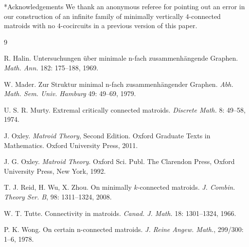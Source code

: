 \documentclass[12pt]{amsart}
\begin{document}
\begin{section}*{Acknowledgements}
We thank an anonymous referee for pointing out an error in our construction of an infinite family of minimally vertically $4$-connected matroids with no $4$-cocircuits in a previous version of this paper.
\end{section}



\begin{thebibliography}{9}

 R. Halin. Untersuchungen \"uber minimale n-fach zusammenh\"angende Graphen. \emph{Math. Ann.} 182: 175--188, 1969.

 W. Mader. Zur Struktur minimal n-fach zusammenh\"angender Graphen. \emph{Abh. Math. Sem. Univ. Hamburg} 49: 49--69, 1979.

 U. S. R. Murty. Extremal critically connected matroids. \emph{Discrete Math.} 8: 49--58, 1974. 

 J. Oxley. \emph{Matroid Theory}, Second Edition. Oxford Graduate Texts in Mathematics. Oxford University Press, 2011.

 J. G. Oxley. \emph{Matroid Theory}. Oxford Sci. Publ. The Clarendon Press, Oxford University Press, New York, 1992.


 T. J. Reid, H. Wu, X. Zhou. On minimally $k$-connected matroids. \emph{J. Combin. Theory Ser. B}, 98: 1311--1324, 2008.


 W. T. Tutte. Connectivity in matroids. \emph{Canad. J. Math.} 18: 1301--1324, 1966.


 P. K. Wong. On certain n-connected matroids. \emph{J. Reine Angew. Math.}, 299/300: 1--6, 1978.

\end{thebibliography}
\end{document}
